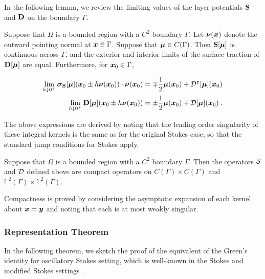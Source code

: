 In the following lemma, we review the limiting values of
the layer potentials ${\bf S}$ and ${\bf D}$ on the boundary $\Gamma$.

\begin{lem} \label{lem:jump-conds}
  Suppose that $\Omega$ is a bounded region with a $C^{2}$ boundary
  $\Gamma$.
  Let ${\boldsymbol \nu}({\boldsymbol x})$ denote the outward pointing normal at ${\boldsymbol x} \in \Gamma$.
  Suppose that ${\boldsymbol \mu} \in C(\Gamma)$.
  Then ${\bf S}[{\boldsymbol \mu}]$
  is continuous across $\Gamma$, and the exterior and interior
  limits of the surface traction of ${\bf D}[{\boldsymbol \mu}]$ are equal.
  Furthermore, for ${\boldsymbol x}_{0} \in \Gamma$,

  \begin{align}
    \lim_{h \downarrow 0^{+}} {\boldsymbol \sigma}_{\bf S}[{\boldsymbol \mu}]({\boldsymbol x}_0 \pm h{\boldsymbol \nu}({\boldsymbol x}_0)) \cdot {\boldsymbol \nu}({\boldsymbol x}_0)
    &= \mp \frac{1}{2} {\boldsymbol \mu}({\boldsymbol x}_0) + {\mathcal D}^{\intercal}[{\boldsymbol \mu}]({\boldsymbol x}_0) \\
    \lim_{h \downarrow 0^{+}} {\bf D}[{\boldsymbol \mu}]({\boldsymbol x}_0 \pm h{\boldsymbol \nu}({\boldsymbol x}_0)) 
    &= \pm \frac{1}{2} {\boldsymbol \mu}({\boldsymbol x}_0) + {\mathcal D}[{\boldsymbol \mu}]({\boldsymbol x}_0)    \; .
  \end{align}
\end{lem}

The above expressions are derived by noting that the
leading order singularity of these integral kernels
is the same as for the original Stokes case, so that
the standard jump conditions for Stokes
\cite{KimSangtae1991,Pozrikidis1992}
apply. 

\begin{lem} \label{lem:compact-sd}
  Suppose that $\Omega$ is a bounded region with a $C^{2}$ boundary
  $\Gamma$. Then the operators ${\mathcal S}$ and ${\mathcal D}$ defined
  above are compact operators on $C(\Gamma)\times C(\Gamma)$
  and $\mathbb{L}^2(\Gamma)\times \mathbb{L}^2(\Gamma)$.
\end{lem}

Compactness is proved by considering the
asymptotic expansion of each kernel about
${\boldsymbol x}={\boldsymbol y}$ and noting that each is at most
weakly singular.

\subsubsection{Representation Theorem}

In the following theorem, we sketch the proof of the equivalent of the
Green's identity for oscillatory Stokes setting, which is well-known
in the Stokes and modified Stokes settings
\cite{Pozrikidis1992,biros2002embedded,ladyzhenskaya1969mathematical}.

